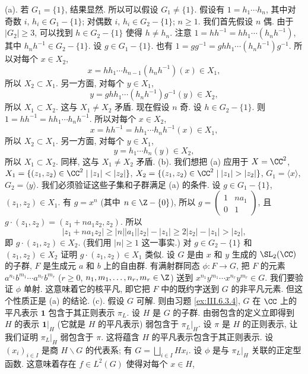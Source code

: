 \begin{solution}
(a). 若 $G_1 = \{1\}$, 结果显然. 所以可以假设 $G_1 \neq \{1\}$.
假设有 $1 = h_1\cdots h_n$, 其中对奇数 $i$, $h_i \in G_1 - \{1\}$; 对偶数 $i$, $h_i \in G_2 - \{1\}$; $n \geq 1$.
我们首先假设 $n$ 偶. 由于 $|G_2| \geq 3$, 可以找到 $h \in G_2 - \{1\}$ 使得 $h \neq h_n$. 注意 $1 = hh^{-1} = hh_1\cdots(h_nh^{-1})$, 其中 $h_nh^{-1} \in G_2 - \{1\}$. 设 $g \in G_1 - \{1\}$. 也有 $1 = gg^{-1} = ghh_1\cdots(h_nh^{-1})g^{-1}$. 所以对每个 $x \in X_2$,
\[
x = hh_1\cdots h_{n-1}(h_nh^{-1})(x) \in X_1,
\]
所以 $X_2 \subset X_1$. 另一方面, 对每个 $y \in X_1$,
\[
y = ghh_1\cdots(h_nh^{-1})g^{-1}(y) \in X_2,
\]
所以 $X_1 \subset X_2$. 这与 $X_1 \neq X_2$ 矛盾.
现在假设 $n$ 奇. 设 $h \in G_2 - \{1\}$. 则 $1 = hh^{-1} = hh_1\cdots h_nh^{-1}$. 所以对每个 $x \in X_2$,
\[
x = hh^{-1} = hh_1\cdots h_nh^{-1}(x) \in X_1,
\]
所以 $X_2 \subset X_1$. 另一方面, 对每个 $y \in X_1$,
\[
y = h_1\cdots h_n(y) \in X_2,
\]
所以 $X_1 \subset X_2$. 同样, 这与 $X_1 \neq X_2$ 矛盾.
(b). 我们想把 (a) 应用于 $X = \CC^2$, $X_1 = \{(z_1, z_2) \in \CC^2 \mid |z_1| < |z_2|\}$, $X_2 = \{(z_1, z_2) \in \CC^2 \mid |z_1| > |z_2|\}$, $G_1 = \langle x \rangle$, $G_2 = \langle y \rangle$. 我们必须验证这些子集和子群满足 (a) 的条件.
设 $g \in G_1 - \{1\}$, $(z_1, z_2) \in X_1$. 有 $g = x^n$ (其中 $n \in \Z - \{0\}$), 所以 $g = \begin{pmatrix} 1 & na_1 \\ 0 & 1 \end{pmatrix}$, 且 $g \cdot (z_1, z_2) = (z_1 + na_1z_2, z_2)$. 所以
\[
|z_1 + na_1z_2| \geq |n||a_1||z_2| - |z_1| \geq 2|z_2| - |z_1| > |z_2|,
\]
即 $g \cdot (z_1, z_2) \in X_2$. (我们用 $|n| \geq 1$ 这一事实.) 对 $g \in G_2 - \{1\}$ 和 $(z_1, z_2) \in X_2$ 证明 $g \cdot (z_1, z_2) \in X_1$ 类似.
设 $G$ 是由 $x$ 和 $y$ 生成的 $\SL_2(\CC)$ 的子群, $F$ 是生成元 $a$ 和 $b$ 上的自由群. 有满射群同态 $\phi \colon F \to G$, 把 $F$ 的元素 $a^{n_1}b^{m_1}\cdots a^{n_r}b^{m_r}$ ($r \geq 0$, $n_1, m_1, \ldots, n_r, m_r \in \Z$) 送到 $x^{n_1}y^{m_1}\cdots x^{n_r}y^{m_r} \in G$. 我们要验证 $\phi$ 单射. 这意味着它的核平凡, 即它把 $F$ 中的既约字送到 $G$ 的非平凡元素. 但这个性质正是 (a) 的结论.
(c). 假设 $G$ 可解. 则由习题 \ref{ex:III.6.3.4}, $G$ 在 $\CC$ 上的平凡表示 $\mathbf{1}$ 包含于其正则表示 $\pi_L$. 设 $H$ 是 $G$ 的子群. 由弱包含的定义立即得到 $H$ 的表示 $\mathbf{1}|_H$ (它就是 $H$ 的平凡表示) 弱包含于 $\pi_L|_H$. 设 $\pi$ 是 $H$ 的正则表示, 让我们证明 $\pi_L|_H$ 弱包含于 $\pi$. 这将蕴含 $H$ 的平凡表示包含于其正则表示.
设 $(x_i)_{i \in I}$ 是商 $H\backslash G$ 的代表系; 有 $G = \bigsqcup_{i \in I}Hx_i$. 设 $\phi$ 是与 $\pi_L|_H$ 关联的正定型函数. 这意味着存在 $f \in L^2(G)$ 使得对每个 $x \in H$,

\end{solution}
